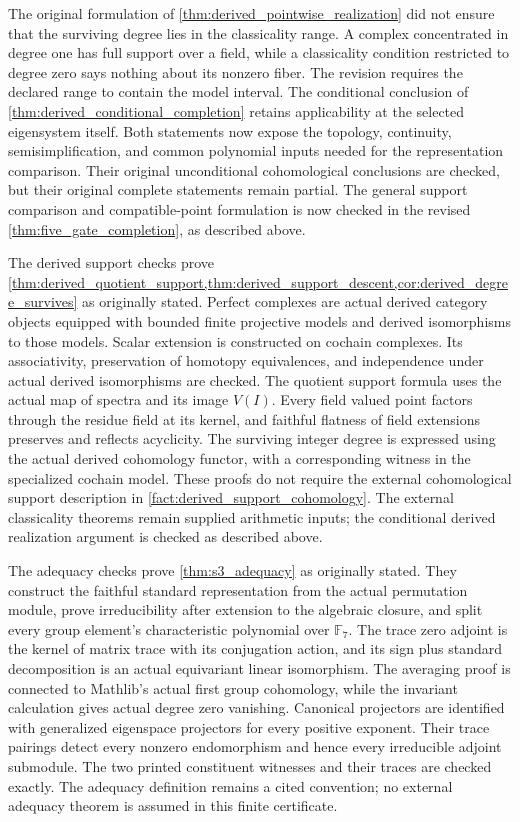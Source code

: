 \documentclass[11pt]{amsart}
\theoremstyle{definition}
\theoremstyle{remark}
\newcommand{\FF}{\mathbb F}
\begin{document}
The original formulation of \cref{thm:derived_pointwise_realization} did not ensure that the surviving degree lies in the classicality range. A complex concentrated in degree one has full support over a field, while a classicality condition restricted to degree zero says nothing about its nonzero fiber. The revision requires the declared range to contain the model interval. The conditional conclusion of \cref{thm:derived_conditional_completion} retains applicability at the selected eigensystem itself. Both statements now expose the topology, continuity, semisimplification, and common polynomial inputs needed for the representation comparison. Their original unconditional cohomological conclusions are checked, but their original complete statements remain partial. The general support comparison and compatible-point formulation is now checked in the revised \cref{thm:five_gate_completion}, as described above.

The derived support checks prove \cref{thm:derived_quotient_support,thm:derived_support_descent,cor:derived_degree_survives} as originally stated. Perfect complexes are actual derived category objects equipped with bounded finite projective models and derived isomorphisms to those models. Scalar extension is constructed on cochain complexes. Its associativity, preservation of homotopy equivalences, and independence under actual derived isomorphisms are checked. The quotient support formula uses the actual map of spectra and its image \(V(I)\). Every field valued point factors through the residue field at its kernel, and faithful flatness of field extensions preserves and reflects acyclicity. The surviving integer degree is expressed using the actual derived cohomology functor, with a corresponding witness in the specialized cochain model. These proofs do not require the external cohomological support description in \cref{fact:derived_support_cohomology}. The external classicality theorems remain supplied arithmetic inputs; the conditional derived realization argument is checked as described above.

The adequacy checks prove \cref{thm:s3_adequacy} as originally stated. They construct the faithful standard representation from the actual permutation module, prove irreducibility after extension to the algebraic closure, and split every group element's characteristic polynomial over \(\FF_7\). The trace zero adjoint is the kernel of matrix trace with its conjugation action, and its sign plus standard decomposition is an actual equivariant linear isomorphism. The averaging proof is connected to Mathlib's actual first group cohomology, while the invariant calculation gives actual degree zero vanishing. Canonical projectors are identified with generalized eigenspace projectors for every positive exponent. Their trace pairings detect every nonzero endomorphism and hence every irreducible adjoint submodule. The two printed constituent witnesses and their traces are checked exactly. The adequacy definition remains a cited convention; no external adequacy theorem is assumed in this finite certificate.
\end{document}
